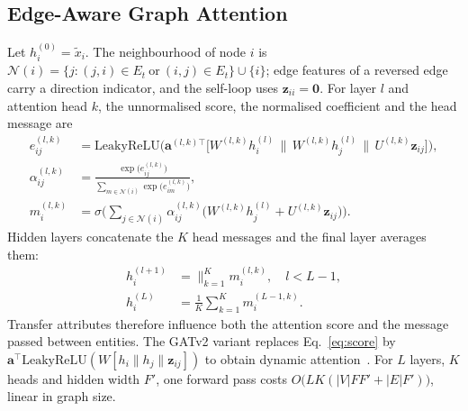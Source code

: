 \documentclass[conference,a4paper]{IEEEtran}
\begin{document}
\subsection{Edge-Aware Graph Attention}
Let $h^{(0)}_i=\tilde x_i$. The neighbourhood of node $i$ is $\mathcal N(i)=\{j:(j,i)\in E_t\ \text{or}\ (i,j)\in E_t\}\cup\{i\}$; edge features of a reversed edge carry a direction indicator, and the self-loop uses $\mathbf z_{ii}=\mathbf 0$. For layer $l$ and attention head $k$, the unnormalised score, the normalised coefficient and the head message are
\begin{align}
e^{(l,k)}_{ij}&=\mathrm{LeakyReLU}\!\Big(\mathbf a^{(l,k)\top}\big[W^{(l,k)}h^{(l)}_i\,\|\,W^{(l,k)}h^{(l)}_j\,\|\,U^{(l,k)}\mathbf z_{ij}\big]\Big),\label{eq:score}\\
\alpha^{(l,k)}_{ij}&=\frac{\exp\big(e^{(l,k)}_{ij}\big)}{\sum_{m\in\mathcal N(i)}\exp\big(e^{(l,k)}_{im}\big)},\label{eq:alpha}\\
m^{(l,k)}_i&=\sigma\Big(\sum_{j\in\mathcal N(i)}\alpha^{(l,k)}_{ij}\big(W^{(l,k)}h^{(l)}_j+U^{(l,k)}\mathbf z_{ij}\big)\Big).\label{eq:msg}
\end{align}
Hidden layers concatenate the $K$ head messages and the final layer averages them:
\begin{align}
h^{(l+1)}_i&=\Big\|_{k=1}^{K}m^{(l,k)}_i,\quad l<L-1,\label{eq:concat}\\
h^{(L)}_i&=\frac1K\sum_{k=1}^{K}m^{(L-1,k)}_i.\label{eq:avg}
\end{align}
Transfer attributes therefore influence both the attention score and the message passed between entities. The GATv2 variant replaces Eq.~\eqref{eq:score} by $\mathbf a^{\top}\mathrm{LeakyReLU}(W[h_i\|h_j\|\mathbf z_{ij}])$ to obtain dynamic attention~\cite{brody2022}. For $L$ layers, $K$ heads and hidden width $F'$, one forward pass costs $O\big(LK(|V|FF'+|E|F')\big)$, linear in graph size.
\end{document}
